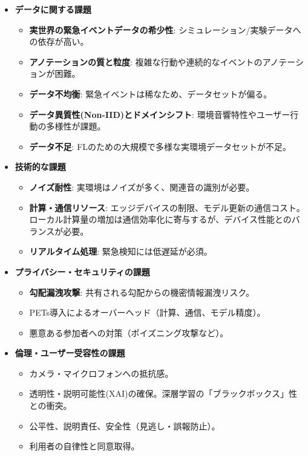 \documentclass[unicode,12pt,aspectratio=169, dvipdfmx]{beamer}
\begin{document}
\begin{frame}{\insertsectionhead}
    \begin{itemize}
        \item \textbf{データに関する課題}
        \begin{itemize}
            \item \textbf{実世界の緊急イベントデータの希少性}: シミュレーション/実験データへの依存が高い。
            \item \textbf{アノテーションの質と粒度}: 複雑な行動や連続的なイベントのアノテーションが困難。
            \item \textbf{データ不均衡}: 緊急イベントは稀なため、データセットが偏る。
            \item \textbf{データ異質性(Non-IID)とドメインシフト}: 環境音響特性やユーザー行動の多様性が課題。
            \item \textbf{データ不足}: FLのための大規模で多様な実環境データセットが不足。
        \end{itemize}
        \item \textbf{技術的な課題}
        \begin{itemize}
            \item \textbf{ノイズ耐性}: 実環境はノイズが多く、関連音の識別が必要。
            \item \textbf{計算・通信リソース}: エッジデバイスの制限、モデル更新の通信コスト。ローカル計算量の増加は通信効率化に寄与するが、デバイス性能とのバランスが必要。
            \item \textbf{リアルタイム処理}: 緊急検知には低遅延が必須。
        \end{itemize}
        \item \textbf{プライバシー・セキュリティの課題}
        \begin{itemize}
            \item \textbf{勾配漏洩攻撃}: 共有される勾配からの機密情報漏洩リスク。
            \item PETs導入によるオーバーヘッド（計算、通信、モデル精度）。
            \item 悪意ある参加者への対策（ポイズニング攻撃など）。
        \end{itemize}
        \item \textbf{倫理・ユーザー受容性の課題}
        \begin{itemize}
            \item カメラ・マイクロフォンへの抵抗感。
            \item 透明性・説明可能性(XAI)の確保。深層学習の「ブラックボックス」性との衝突。
            \item 公平性、説明責任、安全性（見逃し・誤報防止）。
            \item 利用者の自律性と同意取得。
        \end{itemize}
    \end{itemize}
\end{frame}
\end{document}
